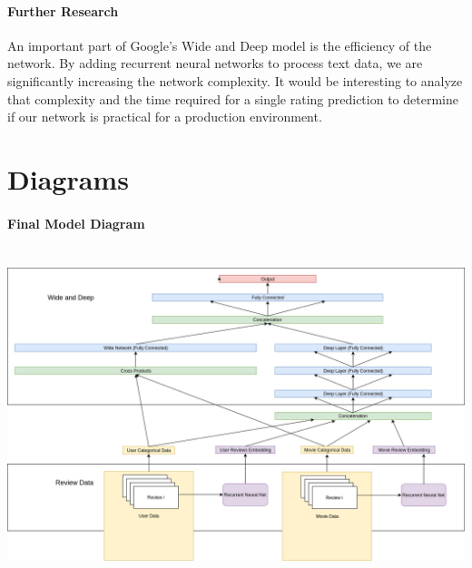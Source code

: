 \documentclass[preprint,10.5pt]{article}
\begin{document}
\paragraph{Further Research} An important part of Google's Wide and Deep model is the efficiency of the network. By adding recurrent neural networks to process text data, we are significantly increasing the network complexity. It would be interesting to analyze that complexity and the time required for a single rating prediction to determine if our network is practical for a production environment.

\section{Diagrams}
\paragraph{Final Model Diagram} \ \newline
\includegraphics[scale=0.38]{network_diagram}
\end{document}
